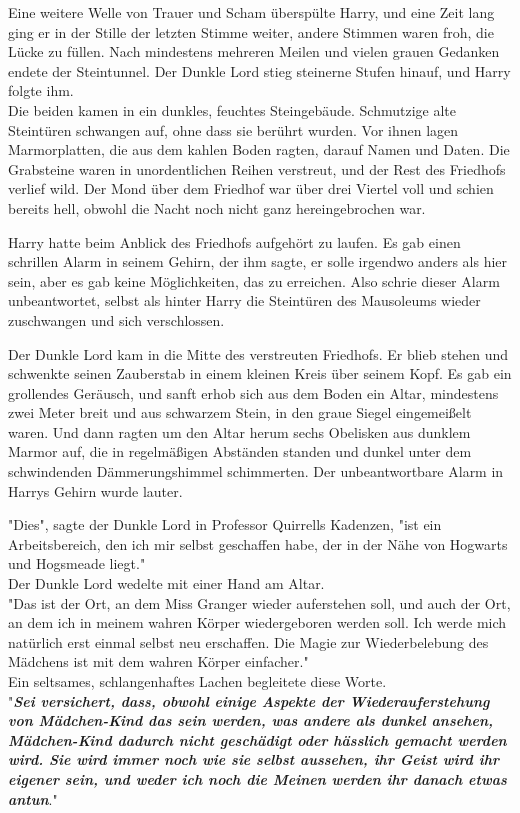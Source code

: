 {Eine weitere Welle von Trauer und Scham überspülte Harry, und eine Zeit lang ging er in der Stille der letzten Stimme weiter, andere Stimmen waren froh, die Lücke zu füllen. Nach mindestens mehreren Meilen und vielen grauen Gedanken endete der Steintunnel. Der Dunkle Lord stieg steinerne Stufen hinauf, und Harry folgte ihm.\\ Die beiden kamen in ein dunkles, feuchtes Steingebäude. Schmutzige alte Steintüren schwangen auf, ohne dass sie berührt wurden. Vor ihnen lagen Marmorplatten, die aus dem kahlen Boden ragten, darauf Namen und Daten. Die Grabsteine waren in unordentlichen Reihen verstreut, und der Rest des Friedhofs verlief wild. Der Mond über dem Friedhof war über drei Viertel voll und schien bereits hell, obwohl die Nacht noch nicht ganz hereingebrochen war.

Harry hatte beim Anblick des Friedhofs aufgehört zu laufen. Es gab einen schrillen Alarm in seinem Gehirn, der ihm sagte, er solle irgendwo anders als hier sein, aber es gab keine Möglichkeiten, das zu erreichen. Also schrie dieser Alarm unbeantwortet, selbst als hinter Harry die Steintüren des Mausoleums wieder zuschwangen und sich verschlossen.

Der Dunkle Lord kam in die Mitte des verstreuten Friedhofs. Er blieb stehen und schwenkte seinen Zauberstab in einem kleinen Kreis über seinem Kopf. Es gab ein grollendes Geräusch, und sanft erhob sich aus dem Boden ein Altar, mindestens zwei Meter breit und aus schwarzem Stein, in den graue Siegel eingemeißelt waren. Und dann ragten um den Altar herum sechs Obelisken aus dunklem Marmor auf, die in regelmäßigen Abständen standen und dunkel unter dem schwindenden Dämmerungshimmel schimmerten. Der unbeantwortbare Alarm in Harrys Gehirn wurde lauter.

"Dies", sagte der Dunkle Lord in Professor Quirrells Kadenzen, "ist ein Arbeitsbereich, den ich mir selbst geschaffen habe, der in der Nähe von Hogwarts und Hogsmeade liegt."\\ Der Dunkle Lord wedelte mit einer Hand am Altar.\\ "Das ist der Ort, an dem Miss Granger wieder auferstehen soll, und auch der Ort, an dem ich in meinem wahren Körper wiedergeboren werden soll. Ich werde mich natürlich erst einmal selbst neu erschaffen. Die Magie zur Wiederbelebung des Mädchens ist mit dem wahren Körper einfacher."\\ Ein seltsames, schlangenhaftes Lachen begleitete diese Worte.\\ "\textbf{\emph{Sei versichert, dass, obwohl einige Aspekte der Wiederauferstehung von Mädchen-Kind das sein werden, was andere als dunkel ansehen, Mädchen-Kind dadurch nicht geschädigt oder hässlich gemacht werden wird. Sie wird immer noch wie sie selbst aussehen, ihr Geist wird ihr eigener sein, und weder ich noch die Meinen werden ihr danach etwas antun}}."

}
